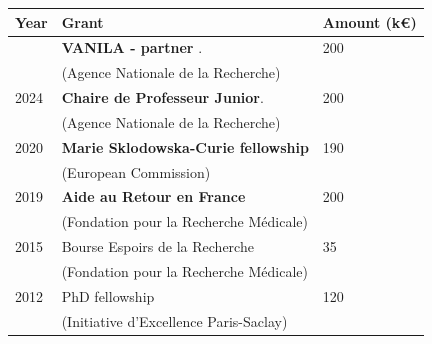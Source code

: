 \documentclass[
]{article}
\author{}
\date{}
\begin{document}
\begin{longtable}[]{@{}lll@{}}
\toprule\noalign{}
Year & Grant & Amount (k€) \\
\midrule\noalign{}
\endhead
\bottomrule\noalign{}
\endlastfoot
2026 & \textbf{VANILA - partner }. & 200\\
& (Agence Nationale de la Recherche) & \\
2024 & \textbf{Chaire de Professeur Junior}. & 200 \\
& (Agence Nationale de la Recherche) & \\
2020 & \textbf{Marie Sklodowska-Curie fellowship} & 190 \\
& (European Commission) & \\
2019 & \textbf{Aide au Retour en France} & 200 \\
& (Fondation pour la Recherche Médicale) & \\
2015 & Bourse Espoirs de la Recherche & 35 \\
& (Fondation pour la Recherche Médicale) & \\
2012 & PhD fellowship & 120 \\
& (Initiative d'Excellence Paris-Saclay) & \\
\end{longtable}
\end{document}

